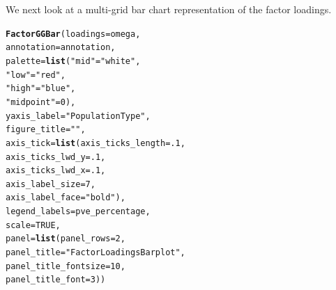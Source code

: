 \documentclass[12pt]{article}\usepackage[]{graphicx}\usepackage[usenames,dvipsnames]{color}
\makeatletter
\newcommand{\hlnum}[1]{\textcolor[rgb]{0.686,0.059,0.569}{#1}}%
\newcommand{\hlstr}[1]{\textcolor[rgb]{0.192,0.494,0.8}{#1}}%
\newcommand{\hlstd}[1]{\textcolor[rgb]{0.345,0.345,0.345}{#1}}%
\newcommand{\hlkwc}[1]{\textcolor[rgb]{0.333,0.667,0.333}{#1}}%
\newcommand{\hlkwd}[1]{\textcolor[rgb]{0.737,0.353,0.396}{\textbf{#1}}}%
\newenvironment{kframe}{%
 \def\at@end@of@kframe{}%
 \ifinner\ifhmode%
  \def\at@end@of@kframe{\end{minipage}}%
  \begin{minipage}{\columnwidth}%
 \fi\fi%
 \def\FrameCommand##1{\hskip\@totalleftmargin \hskip-\fboxsep
 \colorbox{shadecolor}{##1}\hskip-\fboxsep
     \hskip-\linewidth \hskip-\@totalleftmargin \hskip\columnwidth}%
 \MakeFramed {\advance\hsize-\width
   \@totalleftmargin\z@ \linewidth\hsize
   \@setminipage}}%
 {\par\unskip\endMakeFramed%
 \at@end@of@kframe}
\newenvironment{knitrout}{}{} %
\makeatother
\begin{document}
We next look at a multi-grid bar chart representation of the factor loadings.

\begin{knitrout}
\color{fgcolor}\begin{kframe}
\begin{alltt}
\hlkwd{FactorGGBar}\hlstd{(}\hlkwc{loadings} \hlstd{= omega,}
            \hlkwc{annotation} \hlstd{= annotation,}
            \hlkwc{palette} \hlstd{=} \hlkwd{list}\hlstd{(}\hlstr{"mid"}\hlstd{=}\hlstr{"white"}\hlstd{,}
                           \hlstr{"low"}\hlstd{=}\hlstr{"red"}\hlstd{,}
                           \hlstr{"high"}\hlstd{=}\hlstr{"blue"}\hlstd{,}
                           \hlstr{"midpoint"}\hlstd{=}\hlnum{0}\hlstd{),}
            \hlkwc{yaxis_label} \hlstd{=} \hlstr{"Population Type"}\hlstd{,}
            \hlkwc{figure_title} \hlstd{=} \hlstr{" "}\hlstd{,}
            \hlkwc{axis_tick} \hlstd{=} \hlkwd{list}\hlstd{(}\hlkwc{axis_ticks_length} \hlstd{=} \hlnum{.1}\hlstd{,}
                             \hlkwc{axis_ticks_lwd_y} \hlstd{=} \hlnum{.1}\hlstd{,}
                             \hlkwc{axis_ticks_lwd_x} \hlstd{=} \hlnum{.1}\hlstd{,}
                             \hlkwc{axis_label_size} \hlstd{=} \hlnum{7}\hlstd{,}
                             \hlkwc{axis_label_face} \hlstd{=} \hlstr{"bold"}\hlstd{),}
            \hlkwc{legend_labels}\hlstd{=pve_percentage,}
            \hlkwc{scale}\hlstd{=}\hlnum{TRUE}\hlstd{,}
            \hlkwc{panel}\hlstd{=}\hlkwd{list}\hlstd{(}\hlkwc{panel_rows}\hlstd{=}\hlnum{2}\hlstd{,}
                       \hlkwc{panel_title}\hlstd{=}\hlstr{"Factor Loadings Bar plot"}\hlstd{,}
                       \hlkwc{panel_title_fontsize}\hlstd{=}\hlnum{10}\hlstd{,}
                       \hlkwc{panel_title_font}\hlstd{=}\hlnum{3}\hlstd{))}
\end{alltt}
\end{kframe}

\end{knitrout}
\end{document}
